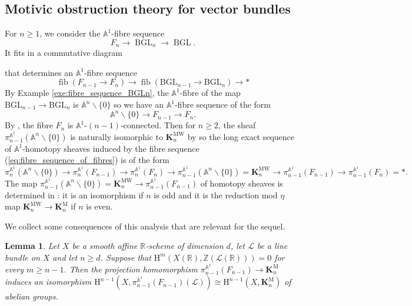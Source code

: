 \documentclass[11pt,leqno]{amsart}
\newcommand{\GL}{{\mathrm{GL}}}
\renewcommand{\1}{{\rm 1\hspace*{-0.4ex}%
\rule{0.1ex}{1.52ex}\hspace*{0.2ex}}}
\renewcommand{\Lc}{{\mathcal L}}
\newcommand{\Hr}{{\mathrm {H}}}
\newcommand{\<}[1]{{\langle}#1 {\rangle}}
\newcommand{\Rb}{\mathbb{R}}
\newcommand{\Zb}{\mathbb{Z}}
\newcommand{\Kbf}{\mathbf{K}}
\newcommand{\Abb}{\mathbb{A}}
\newcommand{\BGL}{\operatorname{BGL}}
\newcommand{\Mr}{\mathrm{M}}
\newcommand{\Br}{\mathrm{B}}
\newcommand{\MW}{\mathrm{MW}}
\theoremstyle{plain}
\newtheorem{lem}[thm]{Lemma}
\theoremstyle{definition}
\theoremstyle{remark}
\numberwithin{equation}{section}
\begin{document}
\subsection{Motivic obstruction theory for vector bundles}

For $n\geq  1$, we consider the $\Abb^1$-fibre sequence \[F_n\to\BGL_n\to\BGL.\] It fits in a commutative diagram
\begin{center}
\end{center}
that determines an $\Abb^1$-fibre sequence \[\operatorname{fib}(F_{n-1}\to F_n)\to\operatorname{fib}(\Br\GL_{n-1}\to\Br\GL_n)\to *\] By Example \ref{exe:fibre_sequence_BGLn}, the $\Abb^1$-fibre of the map $\Br\GL_{n-1}\to\Br\GL_n$ is $\Abb^n\smallsetminus\{0\}$ so we have an $\Abb^1$-fibre sequence of the form 
\begin{equation}\label{eq:fibre_sequence_of_fibres}
\Abb^n\smallsetminus \{0\}\to F_{n-1}\to F_n.
\end{equation}
By \cite[Theorem 3.2]{asokAlgebraicVectorBundles2014}, the fibre $F_n$ is $\Abb^1$-$(n-1)$-connected. Then for $n\geq 2$, the sheaf $\pi_{n-1}^{\Abb^1}(\Abb^n\smallsetminus \{0\})$ is naturally isomorphic to $\Kbf_n^\MW$ by \cite[Theorem 6.40]{morelA1AlgebraicTopologyField2012} so the long exact sequence of $\Abb^1$-homotopy sheaves induced by the fibre sequence (\ref{eq:fibre_sequence_of_fibres}) is of the form 
\begin{equation}\label{eq:exact_sequence_homotopy_sheaves_fibres}
\pi_n^{\Abb^1}(\Abb^n\smallsetminus \{0\})\to\pi_n^{\Abb^1}(F_{n-1})\to\pi_n^{\Abb^1}(F_n)\to\pi_{n-1}^{\Abb^1}(\Abb^n\smallsetminus \{0\})=\Kbf_n^\MW\to\pi_{n-1}^{\Abb^1}(F_{n-1})\rightarrow\pi_{n-1}^{\Abb^1}(F_n)=*.
\end{equation}
The map $\pi_{n-1}^{\Abb^1}(\Abb^n\smallsetminus \{0\})=\Kbf_n^\MW\to\pi_{n-1}^{\Abb^1}(F_{n-1})$ of homotopy sheaves is determined in \cite[p. 15]{duEnumeratingNonStableVector2022}: it is an isomorphism if $n$ is odd and it is the reduction mod $\eta$ map $\Kbf_n^\MW\to\Kbf_n^\Mr$ if $n$ is even.

We collect some consequences of this analysis that are relevant for the sequel.

\begin{lem}\label{lem:cohomology_homotopy_sheaves_milnor}
Let $X$ be a smooth affine $\Rb$-scheme of dimension $d$, let $\Lc$ be a line bundle on $X$ and let $n\geq d$. Suppose that $\Hr^m(X(\Rb),\Zb(\Lc(\Rb)))=0$ for every $m\geq n-1$. Then the projection homomorphism $\pi_{n-1}^{\Abb^1}(F_{n-1})\to\Kbf_{n}^\Mr$ induces an isomorphism $\Hr^{n-1}(X,\pi_{n-1}^{\Abb^1}(F_{n-1})(\Lc))\cong\Hr^{n-1}(X,\Kbf_n^\Mr)$ of abelian groups.
\end{lem}
\end{document}
